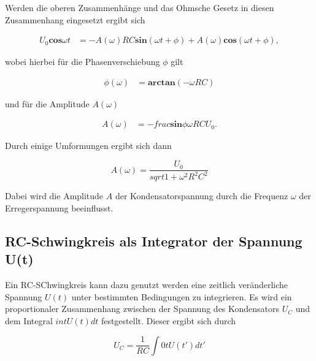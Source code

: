 Werden die oberen Zusammenhänge und das Ohmsche Gesetz in diesen Zusammenhang eingesetzt ergibt sich 

\begin{align*} 
U_{0} \mathbf{cos}\omega t &= -A(\omega) RC \mathbf{sin}(\omega t + \phi) + A(\omega) \mathbf{cos}(\omega t + \phi),  
\end{align*}

wobei hierbei für die Phasenverschiebung $\phi$ gilt 

\begin{align*} 
\phi (\omega)&= \mathbf{arctan}(-\omega RC) 
\end{align*}

und für die Amplitude $A(\omega)$ 

\begin{align*} 
    A(\omega) &= - frac{\mathbf{sin}\phi}{\omega RC} U_{0}.
\end{align*}
    
Durch einige Umformungen ergibt sich dann 

\begin{equation}
A(\omega) = \frac{U_{0}}{sqrt{1 + \omega^2 R^2 C^2}}
\end{equation}

Dabei wird die Amplitude $A$ der Kondensatorspannung durch die Frequenz $\omega$ der Erregerspannung beeinflusst. 

\subsection{RC-Schwingkreis als Integrator der Spannung U(t)}

Ein RC-SChwingkreis kann dazu genutzt werden eine zeitlich veränderliche Spannung $U(t)$ unter bestimmten Bedingungen zu integrieren. 
Es wird ein proportionaler Zusammenhang zwischen der Spannung des Kondensators $U_{C}$ und dem Integral $int{U(t) dt}$ festgestellt. Dieser ergibt sich durch 

\begin{equation}
    U_{C} = \frac{1}{RC} \int{0}{t}{U(t') dt'} 
\end{equation} 



